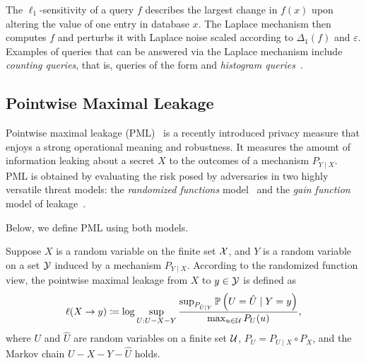 The $\ell_1$-sensitivity of a query $f$ describes the largest change in $f(x)$ upon altering the value of one entry in database $x$. The Laplace mechanism then computes $f$ and perturbs it with Laplace noise scaled according to $\Delta_1(f)$ and $\varepsilon$. Examples of queries that can be answered via the Laplace mechanism include \emph{counting queries}, that is, queries of the form  and \emph{histogram queries}~\cite{dwork2014algorithmic}.

\subsection{Pointwise Maximal Leakage}


Pointwise maximal leakage (PML)~\cite{saeidian2023pointwise_it,saeidian2023pointwise_isit} is a recently introduced privacy measure that enjoys a strong operational meaning and robustness. It measures the amount of information leaking about a secret $X$ to the outcomes of a mechanism $P_{Y \mid X}$. PML is obtained by evaluating the risk posed by adversaries in two highly versatile threat models: the \emph{randomized functions} model~\cite{issaOperationalApproachInformation2020} and the \emph{gain function} model of leakage~\cite{alvim2012measuring}.

Below, we define PML using both models.
\begin{definition}
\label{def:randomized_function_view}
Suppose $X$ is a random variable on the finite set $\mathcal{X}$, and $Y$ is a random variable on a set $\mathcal{Y}$ induced by a mechanism $P_{Y \mid X}$. 
According to the randomized function view, the pointwise maximal leakage from $X$ to $y \in \mathcal{Y}$ is defined as
\begin{equation}
\label{eq:pml_u_sup}
    \ell(X\to y) \coloneqq \log \sup_{U:U-X-Y} \frac{\sup_{P_{\hat U \mid Y}} \mathbb P \left(U=\hat U \mid Y=y \right)}{\max_{u \in \mathcal{U}} P_U(u)},
\end{equation}
where $U$ and $\hat U$ are random variables on a finite set $\mathcal{U}$, $P_{U} = P_{U \mid X} \circ P_X$, and the Markov chain $U-X-Y-\hat U$ holds.
\end{definition}

